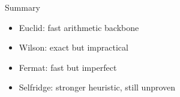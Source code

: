 \documentclass{beamer}
\begin{document}

\begin{frame}{Summary}

\begin{itemize}
    \item Euclid: fast arithmetic backbone

    \item Wilson: exact but impractical

    \item Fermat: fast but imperfect

    \item Selfridge: stronger heuristic, still unproven
\end{itemize}

\end{frame}
\end{document}
